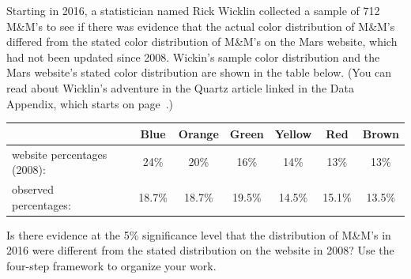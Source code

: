 
\D{\newpage}

\begin{examplewrap}
\begin{nexample}
{Starting in 2016, a statistician named Rick Wicklin collected a sample of 712 M\&M's to see if there was evidence that the actual color distribution of M\&M's differed from the stated color distribution of M\&M's on the Mars website, which had not been updated since 2008.  Wickin's sample color distribution and the Mars website's stated color distribution are shown in the table below.
(You can read about Wicklin's adventure in the Quartz article linked in the Data Appendix, which starts on page~\pageref{data_appendix}.) \\
\begin{center}
\begin{small}
\begin{tabular}{ll ccc ccc}
\hline
	 & \hspace{1mm} & Blue & Orange & Green & Yellow & Red & Brown\\
\hline
website percentages (2008):&		& 24\% & 20\% & 16\% & 14\% & 13\% & 13\%  \\
observed percentages:&		& 18.7\% & 18.7\% & 19.5\% & 14.5\% & 15.1\% & 13.5\%  \\
\hline
\end{tabular}
\end{small}
\end{center}

Is there evidence at the 5\% significance level that the distribution of M\&M's in 2016 were different from the stated distribution on the website in 2008? Use the four-step framework to organize your work. }


\end{nexample}
\end{examplewrap}

